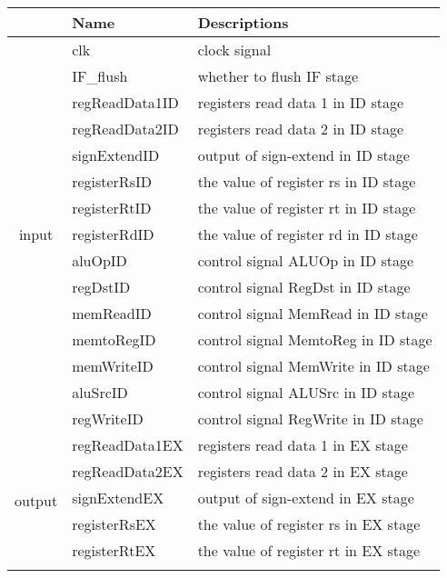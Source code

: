 \documentclass[a4paper]{article}
\begin{document}
\begin{table}[H]
    \centering
    \begin{tabular}{|c|l|l|}
        \hline
        &Name&Descriptions\\
        \hline
        \multirow{15}{*}{input}&clk&clock signal\\
        \cline{2-3}
        &IF\_flush&whether to flush IF stage\\
        \cline{2-3}
        &regReadData1ID&registers read data 1 in ID stage\\
        \cline{2-3}
        &regReadData2ID&registers read data 2 in ID stage\\
        \cline{2-3}
        &signExtendID&output of sign-extend in ID stage\\
        \cline{2-3}
        &registerRsID&the value of register rs in ID stage\\
        \cline{2-3}
        &registerRtID&the value of register rt in ID stage\\
        \cline{2-3}
        &registerRdID&the value of register rd in ID stage\\
        \cline{2-3}
        &aluOpID&control signal ALUOp in ID stage\\
        \cline{2-3}
        &regDstID&control signal RegDst in ID stage\\
        \cline{2-3}
        &memReadID&control signal MemRead in ID stage\\
        \cline{2-3}
        &memtoRegID&control signal MemtoReg in ID stage\\
        \cline{2-3}
        &memWriteID&control signal MemWrite in ID stage\\
        \cline{2-3}
        &aluSrcID&control signal ALUSrc in ID stage\\
        \cline{2-3}
        &regWriteID&control signal RegWrite in ID stage\\
        \hline
        \multirow{13}{*}{output}&regReadData1EX&registers read data 1 in EX stage\\
        \cline{2-3}
        &regReadData2EX&registers read data 2 in EX stage\\
        \cline{2-3}
        &signExtendEX&output of sign-extend in EX stage\\
        \cline{2-3}
        &registerRsEX&the value of register rs in EX stage\\
        \cline{2-3}
        &registerRtEX&the value of register rt in EX stage\\
        \cline{2-3}

\end{tabular}
\end{table}
\end{document}
